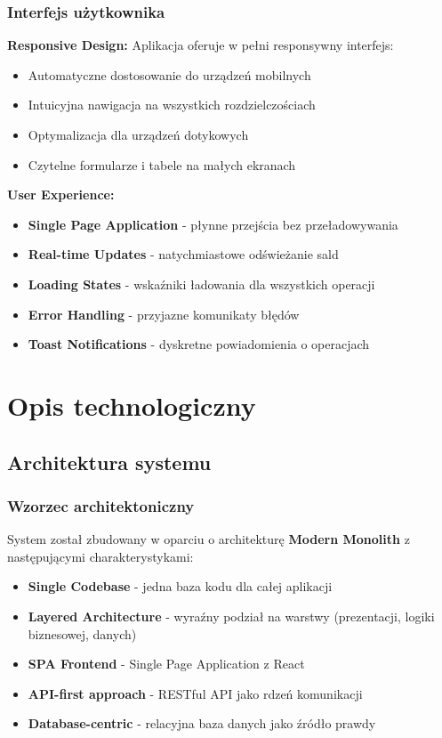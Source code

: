 \documentclass[12pt,a4paper]{article}
\begin{document}
    \subsubsection{Interfejs użytkownika}

    \textbf{Responsive Design:}
    Aplikacja oferuje w pełni responsywny interfejs:
    \begin{itemize}
        \item Automatyczne dostosowanie do urządzeń mobilnych
        \item Intuicyjna nawigacja na wszystkich rozdzielczościach
        \item Optymalizacja dla urządzeń dotykowych
        \item Czytelne formularze i tabele na małych ekranach
    \end{itemize}

    \textbf{User Experience:}
    \begin{itemize}
        \item \textbf{Single Page Application} - płynne przejścia bez przeładowywania
        \item \textbf{Real-time Updates} - natychmiastowe odświeżanie sald
        \item \textbf{Loading States} - wskaźniki ładowania dla wszystkich operacji
        \item \textbf{Error Handling} - przyjazne komunikaty błędów
        \item \textbf{Toast Notifications} - dyskretne powiadomienia o operacjach
    \end{itemize}

    \section{Opis technologiczny}

    \subsection{Architektura systemu}

    \subsubsection{Wzorzec architektoniczny}

    System został zbudowany w oparciu o architekturę \textbf{Modern Monolith} z następującymi charakterystykami:

    \begin{itemize}
        \item \textbf{Single Codebase} - jedna baza kodu dla całej aplikacji
        \item \textbf{Layered Architecture} - wyraźny podział na warstwy (prezentacji, logiki biznesowej, danych)
        \item \textbf{SPA Frontend} - Single Page Application z React
        \item \textbf{API-first approach} - RESTful API jako rdzeń komunikacji
        \item \textbf{Database-centric} - relacyjna baza danych jako źródło prawdy
    \end{itemize}
\end{document}
